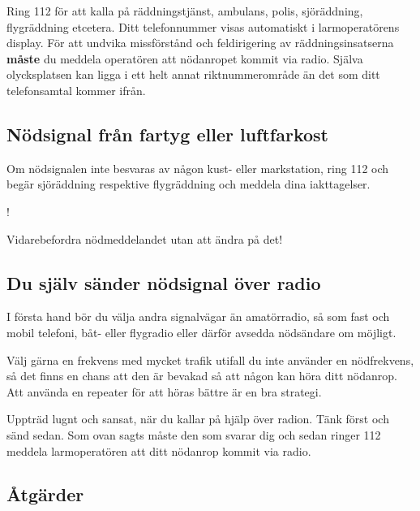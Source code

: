 Ring 112 för att kalla på räddningstjänst, ambulans, polis, sjöräddning,
flygräddning etcetera.
Ditt telefonnummer visas automatiskt i larmoperatörens display.
För att undvika missförstånd och feldirigering av räddningsinsatserna
\textbf{måste} du meddela operatören att nödanropet kommit via radio.
Själva olycksplatsen kan ligga i ett helt annat riktnummerområde än det som ditt
telefonsamtal kommer ifrån.

\subsection{Nödsignal från fartyg eller luftfarkost}

Om nödsignalen inte besvaras av någon kust- eller markstation, ring 112
och begär sjöräddning respektive flygräddning och meddela dina iakttagelser.

\begin{center}
\begin{minipage}{0.19\columnwidth}
\Huge{\Huge{\hspace{1ex}!}}
\end{minipage}
\begin{minipage}{0.7\columnwidth}
Vidarebefordra nödmeddelandet utan att ändra på det!
\end{minipage}
\end{center}


\subsection{Du själv sänder nödsignal över radio}

I första hand bör du välja andra signalvägar än amatörradio, så som fast och
mobil telefoni, båt- eller flygradio eller därför avsedda nödsändare om möjligt.

Välj gärna en frekvens med mycket trafik utifall du inte använder en
nödfrekvens, så det finns en chans att den är bevakad så att någon kan höra
ditt nödanrop.
Att använda en repeater för att höras bättre är en bra strategi.

Uppträd lugnt och sansat, när du kallar på hjälp över radion.
Tänk först och sänd sedan.
Som ovan sagts måste den som svarar dig och sedan ringer 112 meddela
larmoperatören att ditt nödanrop kommit via radio.

\subsection{Åtgärder}

